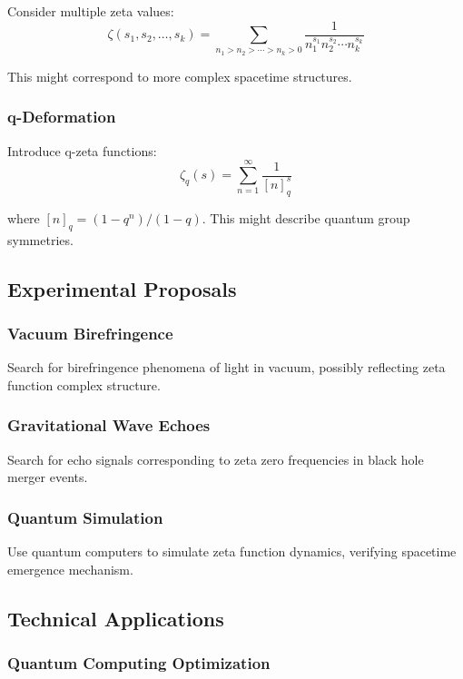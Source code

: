 \documentclass[12pt,a4paper]{article}
\begin{document}
Consider multiple zeta values:
$$\zeta(s_1, s_2, \ldots, s_k) = \sum_{n_1 > n_2 > \cdots > n_k > 0} \frac{1}{n_1^{s_1} n_2^{s_2} \cdots n_k^{s_k}}$$

This might correspond to more complex spacetime structures.

\subsubsection{q-Deformation}

Introduce q-zeta functions:
$$\zeta_q(s) = \sum_{n=1}^{\infty} \frac{1}{[n]_q^s}$$

where $[n]_q = (1-q^n)/(1-q)$. This might describe quantum group symmetries.

\subsection{Experimental Proposals}

\subsubsection{Vacuum Birefringence}

Search for birefringence phenomena of light in vacuum, possibly reflecting zeta function complex structure.

\subsubsection{Gravitational Wave Echoes}

Search for echo signals corresponding to zeta zero frequencies in black hole merger events.

\subsubsection{Quantum Simulation}

Use quantum computers to simulate zeta function dynamics, verifying spacetime emergence mechanism.

\subsection{Technical Applications}

\subsubsection{Quantum Computing Optimization}
\end{document}
